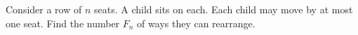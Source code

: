 Consider a row of $n$ seats. A child sits on each. Each child may move by at most one seat. Find the number $F_n$ of ways they can rearrange.
